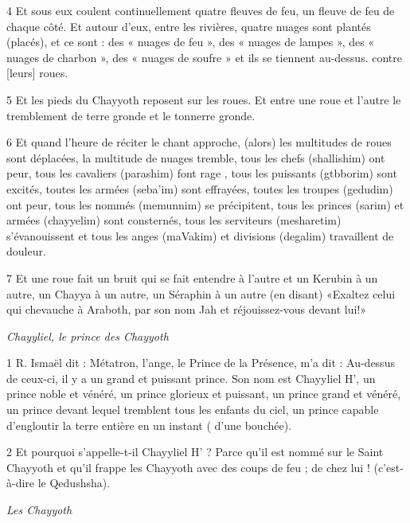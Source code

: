 \par 4 Et sous eux coulent continuellement quatre fleuves de feu, un fleuve de feu de chaque côté. Et autour d'eux, entre les rivières, quatre nuages ​​sont plantés (placés), et ce sont : des « nuages ​​de feu », des « nuages ​​de lampes », des « nuages ​​de charbon », des « nuages ​​de soufre » et ils se tiennent au-dessus. contre [leurs] roues.

\par 5 Et les pieds du Chayyoth reposent sur les roues. Et entre une roue et l’autre le tremblement de terre gronde et le tonnerre gronde.

\par 6 Et quand l'heure de réciter le chant approche, (alors) les multitudes de roues sont déplacées, la multitude de nuages ​​tremble, tous les chefs (shallishim) ont peur, tous les cavaliers (parashim) font rage , tous les puissants (gtbborim) sont excités, toutes les armées (seba'im) sont effrayées, toutes les troupes (gedudim) ont peur, tous les nommés (memunnim) se précipitent, tous les princes (sarim) et armées (chayyelim) sont consternés, tous les serviteurs (mesharetim) s'évanouissent et tous les anges (maVakim) et divisions (degalim) travaillent de douleur.

\par 7 Et une roue fait un bruit qui se fait entendre à l'autre et un Kerubin à un autre, un Chayya à un autre, un Séraphin à un autre (en disant) «Exaltez celui qui chevauche à Araboth, par son nom Jah et réjouissez-vous devant lui!»


\par \textit{Chayyliel, le prince des Chayyoth}

\par 1 R. Ismaël dit : Métatron, l'ange, le Prince de la Présence, m'a dit : Au-dessus de ceux-ci, il y a un grand et puissant prince. Son nom est Chayyliel H', un prince noble et vénéré, un prince glorieux et puissant, un prince grand et vénéré, un prince devant lequel tremblent tous les enfants du ciel, un prince capable d'engloutir la terre entière en un instant ( d'une bouchée).

\par 2 Et pourquoi s'appelle-t-il Chayyliel H' ? Parce qu'il est nommé sur le Saint Chayyoth et qu'il frappe les Chayyoth avec des coups de feu ; de chez lui ! (c'est-à-dire le Qedushsha).


\par \textit{Les Chayyoth}

